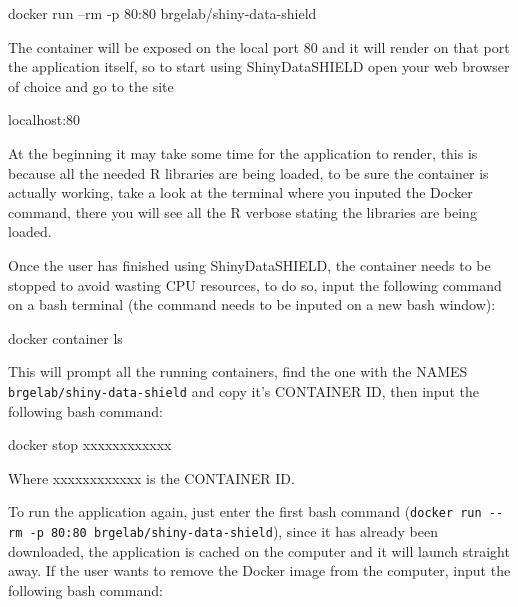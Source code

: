 \documentclass[
]{book}
\newenvironment{Shaded}{\begin{snugshade}}{\end{snugshade}}
\newcommand{\ExtensionTok}[1]{#1}
\newcommand{\NormalTok}[1]{#1}
\begin{document}
\begin{Shaded}
\begin{Highlighting}[]
\ExtensionTok{docker}\NormalTok{ run --rm -p 80:80 brgelab/shiny-data-shield}
\end{Highlighting}
\end{Shaded}

The container will be exposed on the local port 80 and it will render on that port the application itself, so to start using ShinyDataSHIELD open your web browser of choice and go to the site

\begin{Shaded}
\begin{Highlighting}[]
\ExtensionTok{localhost}\NormalTok{:80}
\end{Highlighting}
\end{Shaded}

At the beginning it may take some time for the application to render, this is because all the needed R libraries are being loaded, to be sure the container is actually working, take a look at the terminal where you inputed the Docker command, there you will see all the R verbose stating the libraries are being loaded.

Once the user has finished using ShinyDataSHIELD, the container needs to be stopped to avoid wasting CPU resources, to do so, input the following command on a bash terminal (the command needs to be inputed on a new bash window):

\begin{Shaded}
\begin{Highlighting}[]
\ExtensionTok{docker}\NormalTok{ container ls}
\end{Highlighting}
\end{Shaded}

This will prompt all the running containers, find the one with the NAMES \texttt{brgelab/shiny-data-shield} and copy it's CONTAINER ID, then input the following bash command:

\begin{Shaded}
\begin{Highlighting}[]
\ExtensionTok{docker}\NormalTok{ stop xxxxxxxxxxxx}
\end{Highlighting}
\end{Shaded}

Where xxxxxxxxxxxx is the CONTAINER ID.

To run the application again, just enter the first bash command (\texttt{docker\ run\ -\/-rm\ -p\ 80:80\ brgelab/shiny-data-shield}), since it has already been downloaded, the application is cached on the computer and it will launch straight away. If the user wants to remove the Docker image from the computer, input the following bash command:
\end{document}
